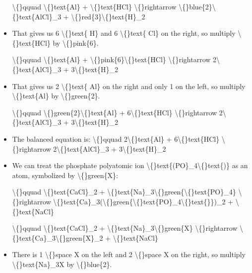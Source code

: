 \documentclass{article}
\begin{document}
\begin{itemize}
                    \textbackslash\{\}qquad
                        \textbackslash\{\}text\{Al\} + \textbackslash\{\}text\{HCl\} \textbackslash\{\}rightarrow \textbackslash\{\}blue\{2\}\textbackslash\{\}text\{AlCl\}\_3 + \textbackslash\{\}red\{3\}\textbackslash\{\}text\{H\}\_2
  \item That gives us 6 \textbackslash\{\}text\{ H\} and 6 \textbackslash\{\}text\{ Cl\}
                        on the right, so multiply
                        \textbackslash\{\}text\{HCl\} by \textbackslash\{\}pink\{6\}.
                    
                    \textbackslash\{\}qquad
                        \textbackslash\{\}text\{Al\} + \textbackslash\{\}pink\{6\}\textbackslash\{\}text\{HCl\} \textbackslash\{\}rightarrow 2\textbackslash\{\}text\{AlCl\}\_3 + 3\textbackslash\{\}text\{H\}\_2
  \item That gives us 2 \textbackslash\{\}text\{ Al\} on the right and
                        only 1 on the left, so multiply
                        \textbackslash\{\}text\{Al\} by \textbackslash\{\}green\{2\}.
                    
                    \textbackslash\{\}qquad
                        \textbackslash\{\}green\{2\}\textbackslash\{\}text\{Al\} + 6\textbackslash\{\}text\{HCl\} \textbackslash\{\}rightarrow 2\textbackslash\{\}text\{AlCl\}\_3 + 3\textbackslash\{\}text\{H\}\_2
  \item The balanced equation is:
                    \textbackslash\{\}qquad
                        2\textbackslash\{\}text\{Al\} + 6\textbackslash\{\}text\{HCl\} \textbackslash\{\}rightarrow 2\textbackslash\{\}text\{AlCl\}\_3 + 3\textbackslash\{\}text\{H\}\_2
  \item We can treat the phosphate polyatomic ion \textbackslash\{\}text\{(PO\}\_4\textbackslash\{\}text\{)\} as an atom, symbolized by \textbackslash\{\}green\{X\}:
                    
                    \textbackslash\{\}qquad
                        \textbackslash\{\}text\{CaCl\}\_2 + \textbackslash\{\}text\{Na\}\_3\textbackslash\{\}green\{\textbackslash\{\}text\{PO\}\_4\} \textbackslash\{\}rightarrow \textbackslash\{\}text\{Ca\}\_3(\textbackslash\{\}green\{\textbackslash\{\}text\{PO\}\_4\textbackslash\{\}text\{\}\})\_2 + \textbackslash\{\}text\{NaCl\}
                    
                    \textbackslash\{\}qquad
                        \textbackslash\{\}text\{CaCl\}\_2 + \textbackslash\{\}text\{Na\}\_3\textbackslash\{\}green\{X\} \textbackslash\{\}rightarrow \textbackslash\{\}text\{Ca\}\_3\textbackslash\{\}green\{X\}\_2 + \textbackslash\{\}text\{NaCl\}
  \item There is 1 \textbackslash\{\}space X on the left and 2 \textbackslash\{\}space X
                        on the right, so multiply
                        \textbackslash\{\}text\{Na\}\_3X by \textbackslash\{\}blue\{2\}.
                    

\end{itemize}
\end{document}
